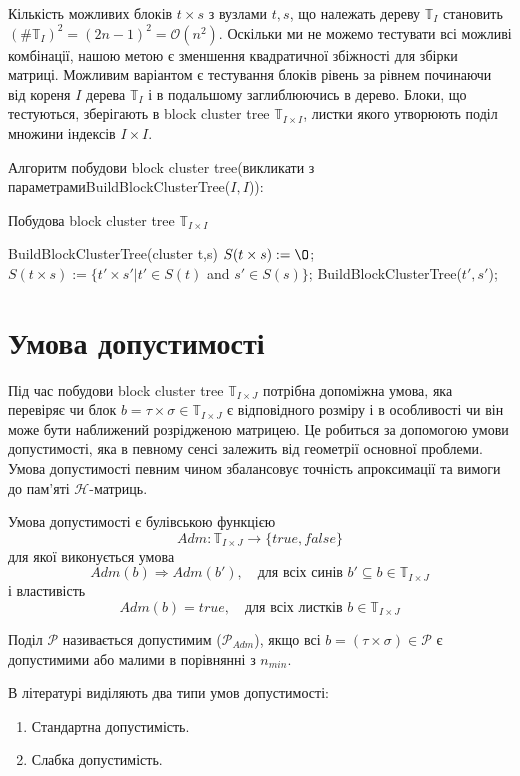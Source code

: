 \documentclass[12pt]{report}
\begin{document}
	\par Кількість можливих блоків $t\times s$ з вузлами $t,s$, що належать дереву $\mathbb{T}_I$ становить $(\#\mathbb{T}_I)^2=(2n-1)^2=\mathcal{O}(n^2)$. Оскільки ми не можемо тестувати всі можливі комбінації, нашою метою є зменшення квадратичної збіжності для збірки матриці. Можливим варіантом є тестування блоків рівень за рівнем починаючи від кореня $I$ дерева $\mathbb{T}_I$ і в подальшому заглиблюючись в дерево. Блоки, що тестуються, зберігають в block cluster tree $\mathbb{T}_{I\times I}$, листки якого утворюють поділ множини індексів $I\times I$. \par Алгоритм побудови block cluster tree(викликати з параметрами\newline BuildBlockClusterTree($I,I$)):
	\begin{algorithm}
	\caption{Побудова block cluster tree $\mathbb{T}_{I\times I}$}
	\begin{algorithmic}
	 BuildBlockClusterTree(cluster t,s)
	\STATE $S(t\times s):=\O$;
	\ELSE
	\STATE $S(t\times s):=\{t'\times s'|t'\in S(t)$ and $s'\in S(s)\}$;
	\STATE BuildBlockClusterTree($t',s'$);
	\ENDFOR
	\ENDIF
	\end{algorithmic}

	\end{algorithm}
	\section{Умова допустимості}
	\hspace{0.8cm} Під час побудови block cluster tree $\mathbb{T}_{I\times J}$ потрібна допоміжна умова, яка перевіряє чи блок $b=\tau\times\sigma\in \mathbb{T}_{I\times J}$ є відповідного розміру і в особливості чи він може бути наближений розрідженою матрицею. Це робиться за допомогою умови допустимості, яка в певному сенсі залежить від геометрії основної проблеми. Умова допустимості певним чином збалансовує точність апроксимації та вимоги до пам'яті $\mathcal{H}$-матриць.
	\begin{Def}
	Умова допустимості є булівською функцією 
	$$Adm:\mathbb{T}_{I\times J}\rightarrow\{true,false\}$$
	для якої виконується умова
	$$Adm(b)\Rightarrow Adm(b'),\quad\text{для всіх синів } b'\subseteq b\in \mathbb{T}_{I\times J} $$
	і властивість\newline 
	\hspace{2cm}$$Adm(b)=true, \quad\text{для всіх листків } b\in \mathbb{T}_{I\times J}$$
	\end{Def}
	\begin{Def}
		Поділ $\mathcal{P}$ називається допустимим ($\mathcal{P}_{Adm}$), якщо всі $b=(\tau\times\sigma)\in \mathcal{P}$ є допустимими або малими в порівнянні з $n_{min}$.
	\end{Def}
	\par В літературі виділяють два типи умов допустимості:
	\begin{enumerate}
	\item { Стандартна допустимість.}
	\item { Слабка допустимість.}
	\end{enumerate}
\end{document}
